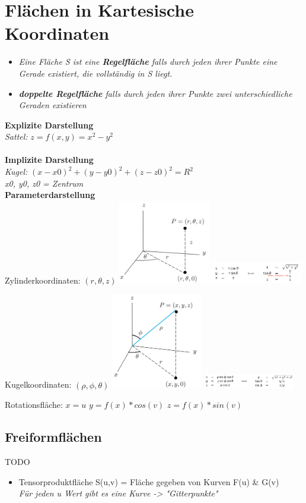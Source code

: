 \section{Flächen in Kartesische Koordinaten}

\begin{itemize}
	\item\textit{Eine Fläche S ist eine \textbf{Regelfläche} falls durch jeden ihrer Punkte eine Gerade existiert, die vollständig in S liegt.}
	\item\textit{\textbf{doppelte Regelfläche} falls durch jeden ihrer Punkte zwei unterschiedliche Geraden existieren}
\end{itemize}



\textbf{Explizite Darstellung} \\
\textit{Sattel:}
$z = f(x,y) = x^2 - y^2$ \\
\\
\textbf{Implizite Darstellung} \\
\textit{Kugel:}
$(x-x0)^2 + (y-y0)^2 + (z-z0)^2 = R^2$ \\
\textit{x0, y0, z0 = Zentrum}
\\
\textbf{Parameterdarstellung} \\

Zylinderkoordinaten:
\textit{$(r,\theta,z)$}
\includegraphics[width=0.3\textwidth]{assets/Zylinderkoordinaten.png}
\includegraphics[width=0.3\textwidth]{assets/ZylinderkoordinatenUmrechnnung.png}

Kugelkoordinaten:
\textit{$(\rho,\phi,\theta)$}
\includegraphics[width=0.3\textwidth]{assets/Kugelkoordinaten.png}
\includegraphics[width=0.3\textwidth]{assets/KugelkoordinatenUmrechnung.png}


Rotationsfläche:
\textit{$x=u$}
\textit{$y = f(x) * cos(v)$}
\textit{$z = f(x) * sin(v)$}
\subsection{Freiformflächen}
TODO

\begin{itemize}
	\item Tensorproduktfläche S(u,v) = Fläche gegeben von Kurven F(u) \& G(v) \\
	\textit{Für jeden u Wert gibt es eine Kurve -> "Gitterpunkte"}
\end{itemize}